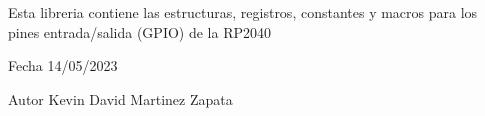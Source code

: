Esta libreria contiene las estructuras, registros, constantes y macros para los pines entrada/salida (GPIO) de la RP2040 \begin{DoxyDate}{Fecha}
14/05/2023 
\end{DoxyDate}
\begin{DoxyAuthor}{Autor}
Kevin David Martinez Zapata 
\end{DoxyAuthor}
